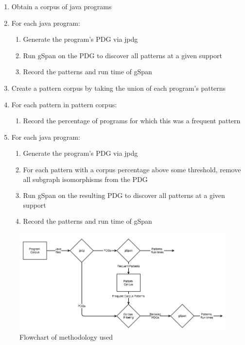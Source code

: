 \documentclass[12pt]{article}
\begin{document}
\begin{enumerate}
    \item Obtain a corpus of java programs
    \item For each java program:
    \begin{enumerate}
        \item Generate the program's PDG via jpdg
        \item Run gSpan on the PDG to discover all patterns at a given support
        \item Record the patterns and run time of gSpan
    \end{enumerate}
    \item Create a pattern corpus by taking the union of each program's patterns
    \item For each pattern in pattern corpus:
    \begin{enumerate}
        \item Record the percentage of programs for which this was a frequent pattern
    \end{enumerate}
    \item For each java program:
    \begin{enumerate}
        \item Generate the program's PDG via jpdg
        \item For each pattern with a corpus percentage above some threshold, remove all subgraph isomorphisms from the PDG
        \item Run gSpan on the resulting PDG to discover all patterns at a given support
        \item Record the patterns and run time of gSpan
    \end{enumerate}
\end{enumerate}

\begin{figure}[ht]
\centerline{
\includegraphics[width=\linewidth]{spec_mining_methodology.png}
}
\caption{\label{mining_methodology}
    Flowchart of methodology used
}
\end{figure}
\end{document}
